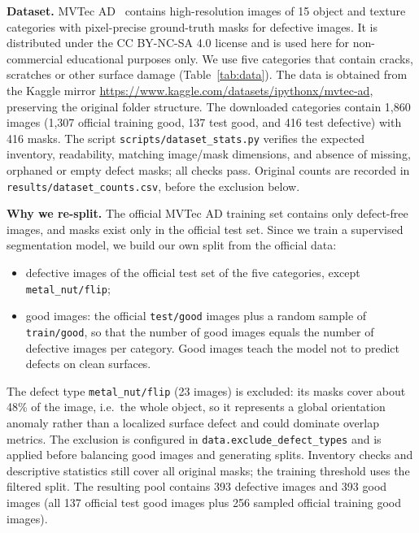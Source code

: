 \documentclass[11pt,a4paper]{article}
\begin{document}
\textbf{Dataset.} MVTec AD~\cite{mvtec} contains high-resolution images of 15 object and texture categories with pixel-precise ground-truth masks for defective images. It is distributed under the CC BY-NC-SA 4.0 license and is used here for non-commercial educational purposes only. We use five categories that contain cracks, scratches or other surface damage (Table~\ref{tab:data}). The data is obtained from the Kaggle mirror \url{https://www.kaggle.com/datasets/ipythonx/mvtec-ad}, preserving the original folder structure. The downloaded categories contain 1,860 images (1,307 official training good, 137 test good, and 416 test defective) with 416 masks. The script \texttt{scripts/dataset\_stats.py} verifies the expected inventory, readability, matching image/mask dimensions, and absence of missing, orphaned or empty defect masks; all checks pass. Original counts are recorded in \texttt{results/dataset\_counts.csv}, before the exclusion below.

\textbf{Why we re-split.} The official MVTec AD training set contains only defect-free images, and masks exist only in the official test set. Since we train a supervised segmentation model, we build our own split from the official data:
\begin{itemize}
  \item defective images of the official test set of the five categories, except \texttt{metal\_nut/flip};
  \item good images: the official \texttt{test/good} images plus a random sample of \texttt{train/good}, so that the number of good images equals the number of defective images per category. Good images teach the model not to predict defects on clean surfaces.
\end{itemize}
The defect type \texttt{metal\_nut/flip} (23 images) is excluded: its masks cover about 48\% of the image, i.e.\ the whole object, so it represents a global orientation anomaly rather than a localized surface defect and could dominate overlap metrics. The exclusion is configured in \texttt{data.exclude\_defect\_types} and is applied before balancing good images and generating splits. Inventory checks and descriptive statistics still cover all original masks; the training threshold uses the filtered split. The resulting pool contains 393 defective images and 393 good images (all 137 official test good images plus 256 sampled official training good images).
\end{document}
